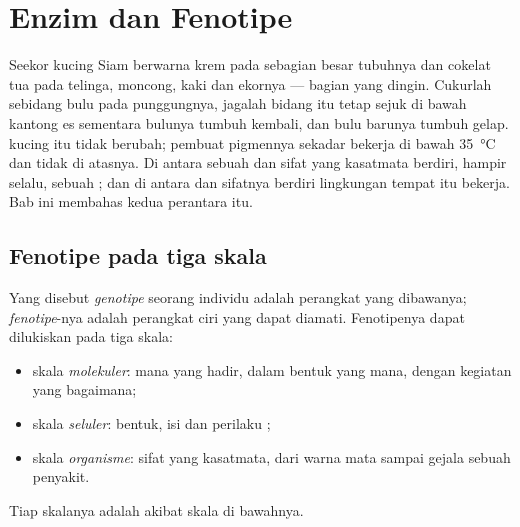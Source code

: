 \chapter{Enzim dan Fenotipe}\label{ch:g11:enzymes-and-phenotype}

Seekor kucing Siam berwarna krem pada sebagian besar tubuhnya dan
cokelat tua pada telinga, moncong, kaki dan ekornya --- bagian yang
dingin. Cukurlah sebidang bulu pada punggungnya, jagalah bidang itu
tetap sejuk di bawah kantong es sementara bulunya tumbuh kembali, dan
bulu barunya tumbuh gelap.  kucing itu tidak berubah;  pembuat
pigmennya sekadar bekerja di bawah \qty{35}{\celsius} dan tidak di
atasnya. Di antara sebuah  dan sifat yang kasatmata berdiri, hampir
selalu, sebuah ; dan di antara  dan sifatnya berdiri
lingkungan tempat  itu bekerja. Bab ini membahas kedua perantara itu.

\section{Fenotipe pada tiga skala}

\begin{definition}\label{def:g11:enzymes-and-phenotype:phenotype}
Yang disebut \emph{genotipe} seorang individu adalah
perangkat  yang dibawanya; \emph{fenotipe}-nya
adalah perangkat ciri yang dapat diamati. Fenotipenya dapat dilukiskan
pada tiga skala:
\begin{itemize}
  \item skala \emph{molekuler}:  mana yang hadir, dalam bentuk
        yang mana, dengan kegiatan yang bagaimana;
  \item skala \emph{seluler}: bentuk, isi dan perilaku ;
  \item skala \emph{organisme}: sifat yang kasatmata, dari warna mata
        sampai gejala sebuah penyakit.
\end{itemize}
Tiap skalanya adalah akibat skala di bawahnya.
\end{definition}

